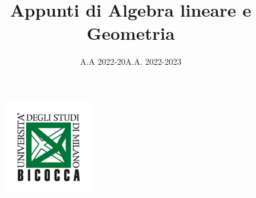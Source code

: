 \documentclass[12pt]{article}
\title{Appunti di Algebra lineare e Geometria}
\date{A.A 2022-20}
\begin{document}
\begin{figure}
\centering
\includegraphics[width=0.35\textwidth]{Immagini/Logo scienze bicocca.png}
\end{figure}

\vspace{10cm}
\date{A.A. 2022-2023}
\maketitle

\newpage

\tableofcontents
\newpage
\end{document}

